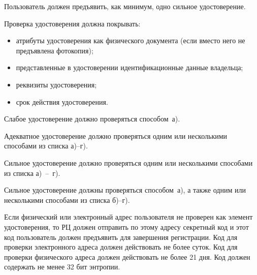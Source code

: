 Пользователь должен предъявить, как минимум, одно сильное удостоверение.



Проверка удостоверения должна покрывать:
\begin{itemize}
\item
атрибуты удостоверения как физического документа 
(если вместо него не предъявлена фотокопия);
\item
представленные в удостоверении идентификационные данные владельца;
\item
реквизиты удостоверения;
\item
срок действия удостоверения.
\end{itemize}


Слабое удостоверение должно проверяться способом~а).


Адекватное удостоверение должно проверяться одним или несколькими способами из 
списка а)--г).


Сильное удостоверение должно проверяться одним или несколькими 
способами из списка а)~--~г).

Сильное удостоверение должны проверяться способом~а), 
а также одним или несколькими способами из списка б)--г).



Если физический или электронный адрес пользователя не проверен
как элемент удостоверения, то РЦ должен отправить по этому 
адресу секретный код и этот код пользователь должен предъявить 
для завершения регистрации. 
%
Код для проверки электронного адреса должен действовать не более суток.
%
Код для проверки физического адреса должен действовать не более 21 дня.
%
Код должен содержать не менее 32 бит энтропии.

